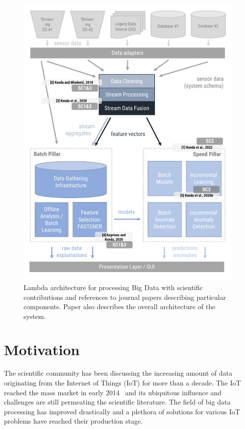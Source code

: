 \begin{figure}
    \centering
    \includegraphics[width=15cm]{figures/the_big_picture_2024.pdf}
    \caption{Lambda architecture for processing Big Data with scientific contributions and references to journal papers describing particular components. Paper \cite{kenda:2022:water-framework} also describes the overall architecture of the system.}
    \label{fig:the_big_picture}
\end{figure}

\section{Motivation}

The scientific community has been discussing the increasing amount of data originating from the Internet of Things (IoT) for more than a decade. The IoT reached the mass market in early 2014~\cite{li:2015:iot} and its ubiquitous influence and challenges are still permeating the scientific literature. 
The field of big data processing has improved drastically and a plethora of solutions for various IoT problems have reached their production stage.

